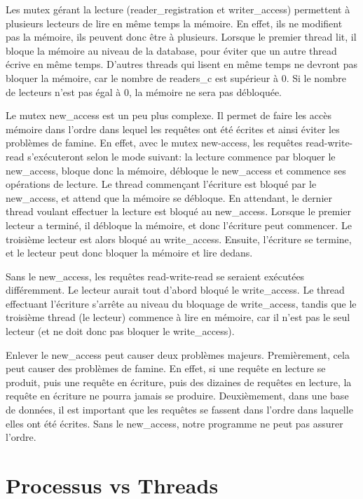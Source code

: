 \documentclass[utf8]{article}
\begin{document}
\begin{large}
\par
Les mutex gérant la lecture (reader\_registration et writer\_access) permettent
à plusieurs lecteurs de lire en même temps la mémoire. En effet, ils ne
modifient pas la mémoire, ils peuvent donc être à plusieurs. Lorsque le premier
thread lit, il bloque la mémoire au niveau de la database, pour éviter que un
autre thread écrive en même temps. D'autres threads qui lisent en même temps ne
devront pas bloquer la mémoire, car le nombre de readers\_c est supérieur à 0.
Si le nombre de lecteurs n'est pas égal à 0, la mémoire ne sera pas débloquée.
\par
Le mutex new\_access est un peu plus complexe. Il permet de faire les accès
mémoire dans l'ordre dans lequel les requêtes ont été écrites et ainsi éviter
les problèmes de famine. En effet, avec le mutex new-access, les requêtes
read-write-read s'exécuteront selon le mode suivant: la lecture commence par
bloquer le new\_access, bloque donc la mémoire, débloque le new\_access et
commence ses opérations de lecture. Le thread commençant l'écriture est bloqué
par le new\_access, et attend que la mémoire se débloque. En attendant, le
dernier thread voulant effectuer la lecture est bloqué au new\_access. Lorsque
le premier lecteur a terminé, il débloque la mémoire, et donc l'écriture peut
commencer. Le troisième lecteur est alors bloqué au write\_access. Ensuite,
l'écriture se termine, et le lecteur peut donc bloquer la mémoire et lire
dedans.
\par
Sans le new\_access, les requêtes read-write-read se seraient
exécutées différemment. Le lecteur aurait tout d'abord bloqué le write\_access.
Le thread effectuant l'écriture s'arrête au niveau du bloquage de
write\_access, tandis que le troisième thread (le lecteur) commence à lire en
mémoire, car il n'est pas le seul lecteur (et ne doit donc pas bloquer le
write\_access).
\par
Enlever le new\_access peut causer deux problèmes majeurs. Premièrement, cela
peut causer des problèmes de famine. En effet, si une requête en lecture se
produit, puis une requête en écriture, puis des dizaines de requêtes en lecture,
la requête en écriture ne pourra jamais se produire. Deuxièmement, dans une base
de données, il est important que les requêtes se fassent dans l'ordre dans
laquelle elles ont été écrites. Sans le new\_access, notre programme ne peut pas
assurer l'ordre.
\par
\section{Processus vs Threads}
\par
\indent


\end{large}
\end{document}
